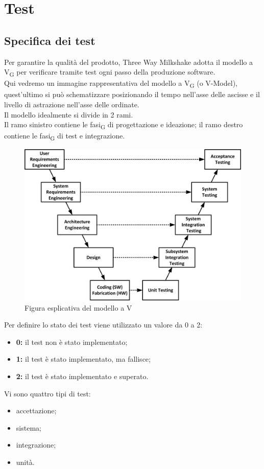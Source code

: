 \section{Test}

\subsection{Specifica dei test}

Per garantire la qualità del prodotto, Three Way Milkshake adotta il modello a V\textsubscript{G} per verificare tramite test ogni passo della produzione software.\\Qui vedremo un immagine rappresentativa del modello a V\textsubscript{G} (o V-Model), quest'ultimo si può schematizzare posizionando il tempo nell'asse delle ascisse e il livello di astrazione nell'asse delle ordinate.\\Il modello idealmente si divide in 2 rami.\\Il ramo sinistro contiene le fasi\textsubscript{G} di progettazione e ideazione; il ramo destro contiene le fasi\textsubscript{G} di test e integrazione.
\begin{figure}[h!]
	\centering
	\includegraphics[scale=0.6]{res/images/v_model.jpg}
	\caption{Figura esplicativa del {modello a V}}
\end{figure}
\newline
Per definire lo stato dei test viene utilizzato un valore da 0 a 2:
\begin{itemize}
	\item \textbf{0:} il test non è stato implementato;
	\item \textbf{1:} il test è stato implementato, ma fallisce;
	\item \textbf{2:} il test è stato implementato e superato.
\end{itemize}
Vi sono quattro tipi di test:
\begin{itemize}
	\item accettazione;
	\item sistema;
	\item integrazione;
	\item unità.
\end{itemize}

